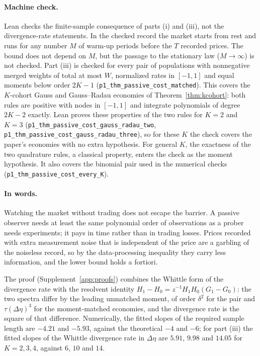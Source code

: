 \documentclass[12pt]{article}
\theoremstyle{definition}
\theoremstyle{remark}
\begin{document}
\paragraph{Machine check.} Lean checks the finite-sample consequence of parts (i) and (iii), not the divergence-rate statements. In the checked record the market starts from rest and runs for any number $M$ of warm-up periods before the $T$ recorded prices. The bound does not depend on $M$, but the passage to the stationary law ($M\to\infty$) is not checked. Part (iii) is checked for every pair of populations with nonnegative merged weights of total at most $W$, normalized rates in $[-1,1]$ and equal moments below order $2K-1$ (\texttt{p1\_thm\_passive\_cost\_matched}). This covers the $K$-cohort Gauss and Gauss--Radau economies of Theorem~\ref{thm:kcohort}: both rules are positive with nodes in $[-1,1]$ and integrate polynomials of degree $2K-2$ exactly. Lean proves these properties of the two rules for $K=2$ and $K=3$ (\texttt{p1\_thm\_passive\_cost\_gauss\_radau\_two}, \texttt{p1\_thm\_passive\_cost\_gauss\_radau\_three}), so for these $K$ the check covers the paper's economies with no extra hypothesis. For general $K$, the exactness of the two quadrature rules, a classical property, enters the check as the moment hypothesis. It also covers the binomial pair used in the numerical checks (\texttt{p1\_thm\_passive\_cost\_every\_K}).

\paragraph{In words.} Watching the market without trading does not escape the barrier. A passive observer needs at least the same polynomial order of observations as a prober needs experiments; it pays in time rather than in trading losses. Prices recorded with extra measurement noise that is independent of the price are a garbling of the noiseless record, so by the data-processing inequality they carry less information, and the lower bound holds a fortiori.


The proof (Supplement~\ref{app:proofs}) combines the Whittle form of the divergence rate with the resolvent identity $H_1-H_0=z^{-1}H_1H_0(G_1-G_0)$: the two spectra differ by the leading unmatched moment, of order $\delta^2$ for the pair and $\tau(\Delta\eta)^3$ for the moment-matched economies, and the divergence rate is the square of that difference. Numerically, the fitted slopes of the required sample length are $-4.21$ and $-5.93$, against the theoretical $-4$ and $-6$; for part (iii) the fitted slopes of the Whittle divergence rate in $\Delta\eta$ are $5.91$, $9.98$ and $14.05$ for $K=2,3,4$, against $6$, $10$ and $14$.
\end{document}
